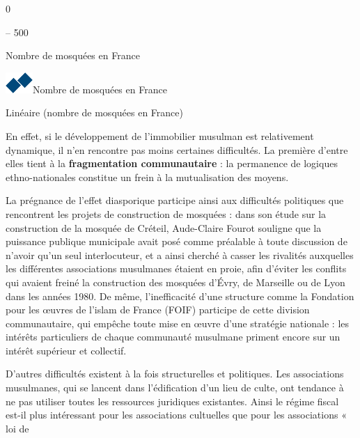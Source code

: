 0

-- 500

\hfill\break
Nombre de mosquées en France


\includegraphics{ImageIslamFrance/media/image9.png}Nombre de mosquées en France

Linéaire (nombre de mosquées en France)

En effet, si le développement de l'immobilier musulman est relativement
dynamique, il n'en rencontre pas moins certaines difficultés. La
première d'entre elles tient à la \textbf{fragmentation communautaire} :
la permanence de logiques ethno-nationales constitue un frein à la
mutualisation des moyens.

La prégnance de l'effet diasporique participe ainsi aux difficultés
politiques que rencontrent les projets de construction de mosquées :
dans son étude sur la construction de la mosquée de Créteil, Aude-Claire
Fourot souligne que la puissance publique municipale avait posé comme
préalable à toute discussion de n'avoir qu'un seul interlocuteur, et a
ainsi cherché à casser les rivalités auxquelles les différentes
associations musulmanes étaient en proie, afin d'éviter les conflits qui
avaient freiné la construction des mosquées d'Évry, de Marseille ou de
Lyon dans les années 1980. De même, l'inefficacité d'une structure comme
la Fondation pour les œuvres de l'islam de France (FOIF) participe de
cette division communautaire, qui empêche toute mise en œuvre d'une
stratégie nationale : les intérêts particuliers de chaque communauté
musulmane priment encore sur un intérêt supérieur et collectif.

D'autres difficultés existent à la fois structurelles et politiques. Les
associations musulmanes, qui se lancent dans l'édification d'un lieu de
culte, ont tendance à ne pas utiliser toutes les ressources juridiques
existantes. Ainsi le régime fiscal est-il plus intéressant pour les
associations cultuelles que pour les associations « loi de



